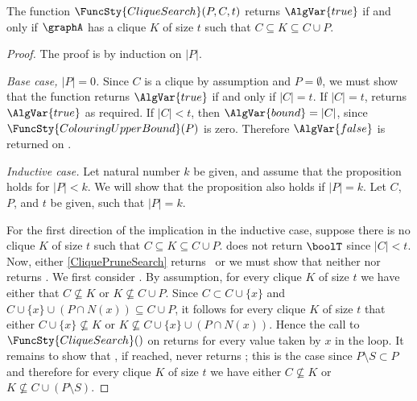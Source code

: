 \begin{proposition}\label{cliqueAlgProp}
    The function $\FuncSty{CliqueSearch}(P,C,t)$ returns $\AlgVar{true}$ if and only if $\graphA$ has a clique
  $K$ of size $t$ such that $C \subseteq K \subseteq C \cup P$.
\end{proposition}
\begin{proof}
  The proof is by induction on $|P|$.
  
  \emph{Base case, $|P|=0$.} Since $C$ is a clique by assumption and $P = \emptyset$,
    we must show that the function returns $\AlgVar{true}$ if and only if $|C| = t$.
    If $|C| = t$,  returns $\AlgVar{true}$ as required.
    If $|C| < t$, then $\AlgVar{bound} = |C|$, since $\FuncSty{ColouringUpperBound}(P)$
    is zero. Therefore $\AlgVar{false}$ is returned on .

  \emph{Inductive case.} Let natural number $k$ be given, and assume that the proposition holds
    for $|P| < k$. We will show that the proposition also holds if $|P| = k$.  Let $C$, $P$,
    and $t$ be given, such that $|P| = k$.

  For the first direction of the implication in the inductive case, suppose there is no clique
  $K$ of size $t$ such that $C \subseteq K \subseteq C \cup P$.  
  does not return $\boolT$ since $|C| < t$. Now, either \cref{CliquePruneSearch} returns \boolF\
  or we must show that neither  nor 
  returns \boolT. We first consider \lineref{CliqueFirstSearch}. By assumption, for every clique $K$
  of size $t$ we have either that $C \not\subseteq K$ or $K \not\subseteq C \cup P$.  Since
  $C \subset C \cup \{x\}$ and $C \cup \{x\} \cup (P \cap N(x)) \subseteq C \cup P$, it follows
  for every clique $K$ of size $t$ that either
  $C \cup \{x\} \not\subseteq K$ or $K \not\subseteq C \cup \{x\} \cup (P \cap N(x))$.  Hence
  the call to $\FuncSty{CliqueSearch}()$ on \lineref{CliqueFirstSearch} returns \boolF
  for every value taken by $x$ in the loop.  It remains to show
  that , if reached, never returns \boolT; this is the case since
  $P \setminus S \subset P$ and therefore for every clique $K$ of size $t$ we have either
  $C \not\subseteq K$ or $K \not\subseteq C \cup (P \setminus S)$.


\end{proof}
